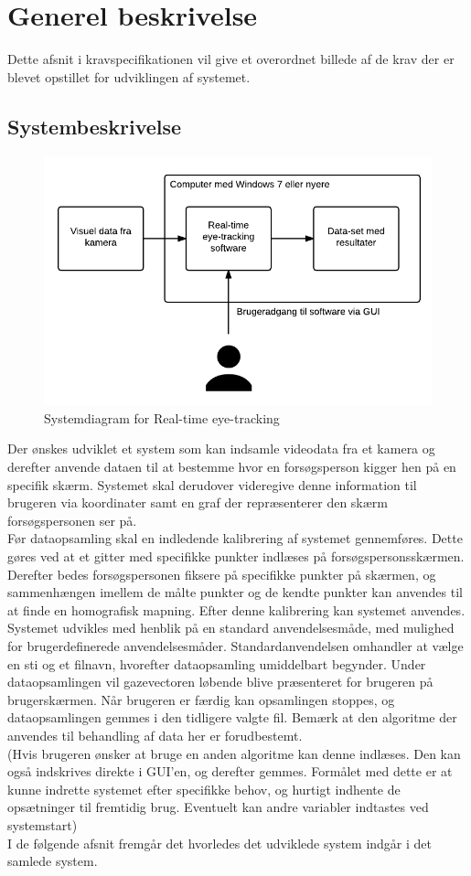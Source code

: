 \documentclass[kravspec.tex]{subfiles}
\begin{document}
\section{Generel beskrivelse}
Dette afsnit i kravspecifikationen vil give et overordnet billede af de krav der er blevet opstillet for udviklingen af systemet.
	
\subsection{Systembeskrivelse}
\begin{figure}[h]
\centering
\includegraphics[width=0.7\linewidth]{../Systemdiagram.png}
\caption[Systemdiagram]{Systemdiagram for Real-time eye-tracking}
\label{fig:Systemdiagram}
\end{figure}
Der ønskes udviklet et system som kan indsamle videodata fra et kamera og derefter anvende dataen til
at bestemme hvor en forsøgsperson kigger hen på en specifik skærm. Systemet skal derudover videregive
denne information til brugeren via koordinater samt en graf der repræsenterer den skærm forsøgspersonen
ser på.
\\
\indent
Før dataopsamling skal en indledende kalibrering af systemet gennemføres. Dette gøres ved at et gitter med
specifikke punkter indlæses på forsøgspersonsskærmen. Derefter bedes forsøgspersonen fiksere på specifikke punkter
på skærmen, og sammenhængen imellem de målte punkter og de kendte punkter kan anvendes til at finde en
homografisk mapning. Efter denne kalibrering kan systemet anvendes.
\\
\indent
Systemet udvikles med henblik på en standard anvendelsesmåde, med mulighed for brugerdefinerede anvendelsesmåder. 
Standardanvendelsen omhandler at vælge en sti og et filnavn, hvorefter dataopsamling umiddelbart begynder.
Under dataopsamlingen vil gazevectoren løbende blive præsenteret for brugeren på brugerskærmen. Når brugeren er 
færdig kan opsamlingen stoppes, og dataopsamlingen gemmes i den tidligere valgte fil. Bemærk at den algoritme
der anvendes til behandling af data her er forudbestemt.
\\
(Hvis brugeren ønsker at bruge en anden algoritme kan denne indlæses. Den kan også indskrives direkte i
GUI'en, og derefter gemmes. Formålet med dette er at kunne indrette systemet efter specifikke behov, og
hurtigt indhente de opsætninger til fremtidig brug. Eventuelt kan andre variabler indtastes ved systemstart) 
\\
\indent
I de følgende afsnit fremgår det hvorledes det udviklede system indgår i det samlede system.
\end{document}
